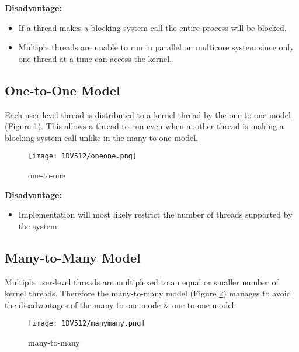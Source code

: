 \documentclass[a4paper,11pt]{article}
\begin{document}
\textbf{Disadvantage:} 
\begin{itemize}
    \item If a thread makes a blocking system call the entire process will be blocked.
    \item Multiple threads are unable to run in parallel on multicore system since only one thread at a time can access the kernel. 
\end{itemize}

\subsection{One-to-One Model}
Each user-level thread is distributed to a kernel thread by the one-to-one model (Figure \ref{onetoone}). This allows a thread to run even when another thread is making a blocking system call unlike in the many-to-one model. 

\begin{figure}[ht]
[1]
\centering
\texttt{[image: 1DV512/oneone.png]}
\caption{one-to-one}
\label{onetoone}
\end{figure}

\textbf{Disadvantage:} 
\begin{itemize}
    \item Implementation will most likely restrict the number of threads supported by the system.
\end{itemize}
\subsection{Many-to-Many Model}
Multiple user-level threads are multiplexed to an equal or smaller number of kernel threads. Therefore the many-to-many model (Figure \ref{manytomany}) manages to avoid the disadvantages of the many-to-one mode \& one-to-one model.

\begin{figure}[ht]
[1]
\centering
\texttt{[image: 1DV512/manymany.png]}
\caption{many-to-many}
\label{manytomany}
\end{figure}
\end{document}
